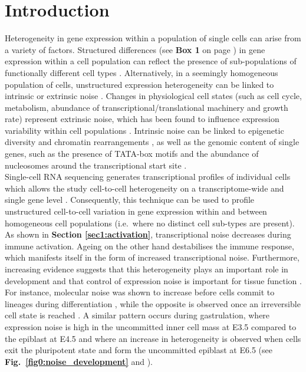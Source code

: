 
\section{Introduction}

Heterogeneity in gene expression within a population of single cells can arise from a variety of factors. Structured differences (see \textbf{Box 1} on page \pageref{box1}) in gene expression within a cell population can reflect the presence of sub-populations of functionally different cell types \citep{Zeisel2015, Paul2015}. Alternatively, in a seemingly homogeneous population of cells,  unstructured expression heterogeneity can be linked to intrinsic or extrinsic noise \citep{Elowitz2002}. Changes in physiological cell states (such as cell cycle, metabolism, abundance of transcriptional/translational machinery and growth rate) represent extrinsic noise, which has been found to influence expression variability within cell populations \citep{Keren2015, Buettner2015, Zeng2017}. Intrinsic noise can be linked to epigenetic diversity \citep{Smallwood2014} and chromatin rearrangements \citep{Buenrostro2015}, as well as the genomic content of single genes, such as the presence of TATA-box motifs and the abundance of nucleosomes around the transcriptional start site \citep{Hornung2012}.  \\ 

Single-cell RNA sequencing generates transcriptional profiles of individual cells which allows the study cell-to-cell heterogeneity on a transcriptome-wide \citep{Grun2014} and single gene level \citep{Goolam2016}. Consequently, this technique can be used to profile unstructured cell-to-cell variation in gene expression within and between homogeneous cell populations (i.e.~where no distinct cell sub-types are present). As shown in \textbf{Section \ref{sec1:activation}}, transcriptional noise decreases during immune activation. Ageing on the other hand destabilises the immune response, which manifests itself in the form of increased transcriptional noise. Furthermore, increasing evidence suggests that this heterogeneity plays an important role in development \citep{Chang2008} and that control of expression noise is important for tissue function \citep{BaharHalpern2015}. For instance, molecular noise was shown to increase before cells commit to lineages during differentiation \citep{Mojtahedi2016}, while the opposite is observed once an irreversible cell state is reached \citep{Richard2016}. A similar pattern occurs during gastrulation, where expression noise is high in the uncommitted inner cell mass at E3.5 compared to the epiblast at E4.5 and where an increase in heterogeneity is observed when cells exit the pluripotent state and form the uncommitted epiblast at E6.5 (see \textbf{Fig.~\ref{fig0:noise_development}} and \citep{Mohammed2017}). \\

